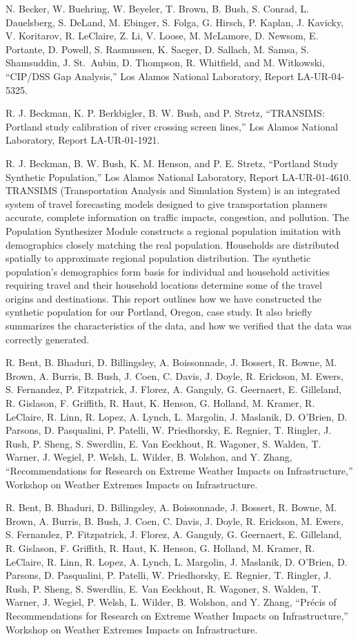 \documentclass[]{article}
\begin{document}
N. Becker, W. Buehring, W. Beyeler, T. Brown, B. Bush, S. Conrad, L.
Dauelsberg, S. DeLand, M. Ebinger, S. Folga, G. Hirsch, P. Kaplan, J.
Kavicky, V. Koritarov, R. LeClaire, Z. Li, V. Loose, M. McLamore, D.
Newsom, E. Portante, D. Powell, S. Rasmussen, K. Saeger, D. Sallach, M.
Samsa, S. Shamsuddin, J. St.~Aubin, D. Thompson, R. Whitfield, and M.
Witkowski, ``CIP/DSS Gap Analysis,'' Los Alamos National Laboratory,
Report LA-UR-04-5325.

R. J. Beckman, K. P. Berkbigler, B. W. Bush, and P. Stretz, ``TRANSIMS:
Portland study calibration of river crossing screen lines,'' Los Alamos
National Laboratory, Report LA-UR-01-1921.

R. J. Beckman, B. W. Bush, K. M. Henson, and P. E. Stretz, ``Portland
Study Synthetic Population,'' Los Alamos National Laboratory, Report
LA-UR-01-4610. TRANSIMS (Transportation Analysis and Simulation System)
is an integrated system of travel forecasting models designed to give
transportation planners accurate, complete information on traffic
impacts, congestion, and pollution. The Population Synthesizer Module
constructs a regional population imitation with demographics closely
matching the real population. Households are distributed spatially to
approximate regional population distribution. The synthetic population's
demographics form basis for individual and household activities
requiring travel and their household locations determine some of the
travel origins and destinations. This report outlines how we have
constructed the synthetic population for our Portland, Oregon, case
study. It also briefly summarizes the characteristics of the data, and
how we verified that the data was correctly generated.

R. Bent, B. Bhaduri, D. Billingsley, A. Boissonnade, J. Bossert, R.
Bowne, M. Brown, A. Burris, B. Bush, J. Coen, C. Davis, J. Doyle, R.
Erickson, M. Ewers, S. Fernandez, P. Fitzpatrick, J. Florez, A. Ganguly,
G. Geernaert, E. Gilleland, R. Gislason, F. Griffith, R. Haut, K.
Henson, G. Holland, M. Kramer, R. LeClaire, R. Linn, R. Lopez, A. Lynch,
L. Margolin, J. Maslanik, D. O'Brien, D. Parsons, D. Pasqualini, P.
Patelli, W. Priedhorsky, E. Regnier, T. Ringler, J. Rush, P. Sheng, S.
Swerdlin, E. Van Eeckhout, R. Wagoner, S. Walden, T. Warner, J. Wegiel,
P. Welsh, L. Wilder, B. Wolshon, and Y. Zhang, ``Recommendations for
Research on Extreme Weather Impacts on Infrastructure,'' Workshop on
Weather Extremes Impacts on Infrastructure.

R. Bent, B. Bhaduri, D. Billingsley, A. Boissonnade, J. Bossert, R.
Bowne, M. Brown, A. Burris, B. Bush, J. Coen, C. Davis, J. Doyle, R.
Erickson, M. Ewers, S. Fernandez, P. Fitzpatrick, J. Florez, A. Ganguly,
G. Geernaert, E. Gilleland, R. Gislason, F. Griffith, R. Haut, K.
Henson, G. Holland, M. Kramer, R. LeClaire, R. Linn, R. Lopez, A. Lynch,
L. Margolin, J. Maslanik, D. O'Brien, D. Parsons, D. Pasqualini, P.
Patelli, W. Priedhorsky, E. Regnier, T. Ringler, J. Rush, P. Sheng, S.
Swerdlin, E. Van Eeckhout, R. Wagoner, S. Walden, T. Warner, J. Wegiel,
P. Welsh, L. Wilder, B. Wolshon, and Y. Zhang, ``Précis of
Recommendations for Research on Extreme Weather Impacts on
Infrastructure,'' Workshop on Weather Extremes Impacts on
Infrastructure.
\end{document}
